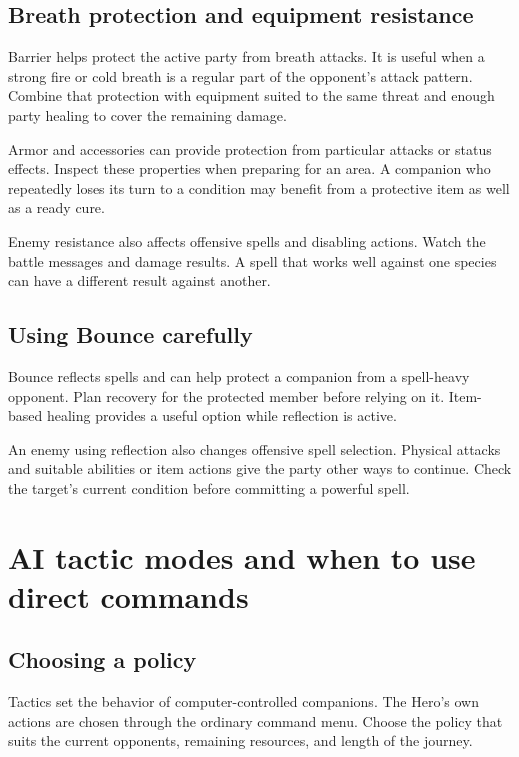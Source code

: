 \subsection*{Breath protection and equipment resistance}

Barrier helps protect the active party from breath attacks. It is useful
when a strong fire or cold breath is a regular part of the opponent's
attack pattern. Combine that protection with equipment suited to the
same threat and enough party healing to cover the remaining damage.

Armor and accessories can provide protection from particular attacks or
status effects. Inspect these properties when preparing for an area.
A companion who repeatedly loses its turn to a condition may benefit
from a protective item as well as a ready cure.

Enemy resistance also affects offensive spells and disabling actions.
Watch the battle messages and damage results. A spell that works well
against one species can have a different result against another.

\subsection*{Using Bounce carefully}

Bounce reflects spells and can help protect a companion from a spell-heavy
opponent. Plan recovery for the protected member before relying on it.
Item-based healing provides a useful option while reflection is active.

An enemy using reflection also changes offensive spell selection.
Physical attacks and suitable abilities or item actions give the party
other ways to continue. Check the target's current condition before
committing a powerful spell.

\section{AI tactic modes and when to use direct commands}

\subsection*{Choosing a policy}

Tactics set the behavior of computer-controlled companions. The Hero's
own actions are chosen through the ordinary command menu. Choose the
policy that suits the current opponents, remaining resources, and length
of the journey.

